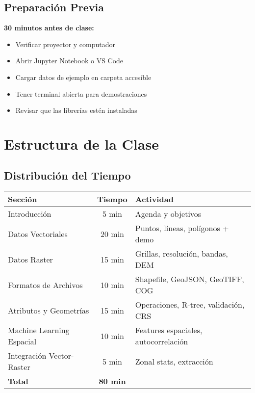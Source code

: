 \documentclass[11pt,a4paper]{article}
\newcommand{\nota}[1]{\begin{tcolorbox}[colback=yellow!10,colframe=orange,title={NOTA}]#1\end{tcolorbox}}
\begin{document}
\subsection{Preparación Previa}

\nota{
\textbf{30 minutos antes de clase:}
\begin{itemize}
    \item Verificar proyector y computador
    \item Abrir Jupyter Notebook o VS Code
    \item Cargar datos de ejemplo en carpeta accesible
    \item Tener terminal abierta para demostraciones
    \item Revisar que las librerías estén instaladas
\end{itemize}
}

\newpage

\section{Estructura de la Clase}

\subsection{Distribución del Tiempo}

\begin{table}[h]
\centering
\begin{tabular}{|l|c|l|}
\hline
\textbf{Sección} & \textbf{Tiempo} & \textbf{Actividad} \\
\hline
Introducción & 5 min & Agenda y objetivos \\
Datos Vectoriales & 20 min & Puntos, líneas, polígonos + demo \\
Datos Raster & 15 min & Grillas, resolución, bandas, DEM \\
Formatos de Archivos & 10 min & Shapefile, GeoJSON, GeoTIFF, COG \\
Atributos y Geometrías & 15 min & Operaciones, R-tree, validación, CRS \\
Machine Learning Espacial & 10 min & Features espaciales, autocorrelación \\
Integración Vector-Raster & 5 min & Zonal stats, extracción \\
\hline
\textbf{Total} & \textbf{80 min} & \\
\hline
\end{tabular}
\end{table}
\end{document}
